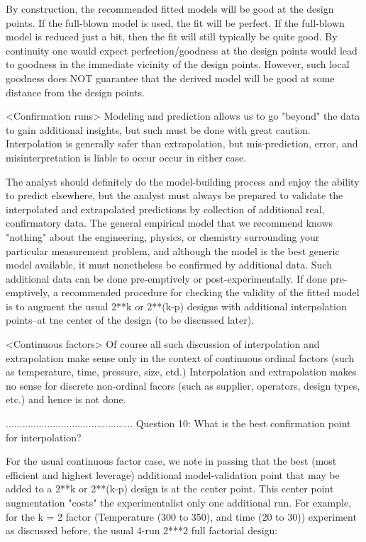 By construction, the recommended fitted models
will be good at the design points.  If the
full-blown model is used, the fit will be perfect.
If the full-blown model is reduced just a bit,
then the fit will still typically be quite good.
By continuity one would expect perfection/goodness
at the design points would lead to goodness in the
immediate vicinity of the design points.  However,
such local goodness does NOT guarantee that the
derived model will be good at some distance from
the design points.

<Confirmation runs>
Modeling and prediction allows us to go "beyond"
the data to gain additional insights, but such
must be done with great caution.  Interpolation is
generally safer than extrapolation, but
mis-prediction, error, and misinterpretation is
liable to occur occur in either case.

The analyst should definitely do the
model-building process and enjoy the ability to
predict elsewhere, but the analyst must always be
prepared to validate the interpolated and
extrapolated predictions by collection of
additional real, confirmatory data.  The general
empirical model that we recommend knows "nothing"
about the engineering, physics, or chemistry
surrounding your particular measurement problem,
and although the model is the best generic model
available, it must nonetheless be confirmed by
additional data.  Such additional data can be done
pre-emptively or post-experimentally.  If done
pre-emptively, a recommended procedure for
checking the validity of the fitted model is to
augment the usual 2**k or 2**(k-p) designs with
additional interpolation points--at tne center of
the design (to be discussed later).

<Continuous factors>
Of course all such discussion of interpolation and
extrapolation make sense only in the context of
continuous ordinal factors (such as temperature,
time, pressure, size, etd.) Interpolation and
extrapolation makes no sense for discrete
non-ordinal facors (such as supplier, operators,
design types, etc.) and hence is not done.

..............................................
Question 10: What is the best confirmation point
            for interpolation?

For the usual continuous factor case, we note in
passing that the best (most efficient and highest
leverage) additional model-validation point that
may be added to a 2**k or 2**(k-p) design is at
the center point.  This center point augmentation
"costs" the experimentalist only one additional
run.  For example, for the k = 2 factor
(Temperature (300 to 350), and time (20 to 30))
experiment as discussed before, the usual 4-run
2***2 full factorial design:

